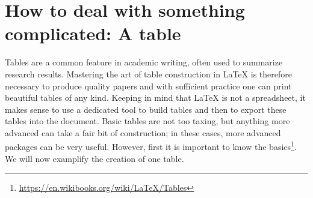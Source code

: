 \section{How to deal with something complicated: A table}
Tables are a common feature in academic writing, often used to summarize research results. Mastering the art of table construction in LaTeX is therefore necessary to produce quality papers and with sufficient practice one can print beautiful tables of any kind. Keeping in mind that LaTeX is not a spreadsheet, it makes sense to use a dedicated tool to build tables and then to export these tables into the document. Basic tables are not too taxing, but anything more advanced can take a fair bit of construction; in these cases, more advanced packages can be very useful. However, first it is important to know the basics\footnote{\url{https://en.wikibooks.org/wiki/LaTeX/Tables}}.
We will now examplify the creation of one table.


